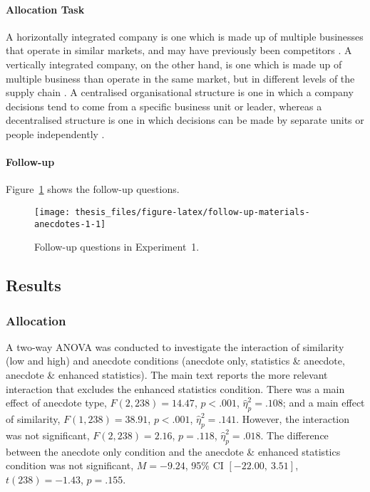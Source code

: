 \documentclass[a4paper, nobind]{templates/ociamthesis}
\theoremstyle{definition}
\theoremstyle{definition}
\theoremstyle{definition}
\theoremstyle{definition}
\theoremstyle{remark}
\begin{document}
\hypertarget{allocation-materials-anecdotes-1}{%
\paragraph{Allocation Task}\label{allocation-materials-anecdotes-1}}

A horizontally integrated company is one which is made up of multiple businesses
that operate in similar markets, and may have previously been competitors
\autocite{gaughan2012}. A vertically integrated company, on the other hand, is one which
is made up of multiple business than operate in the same market, but in
different levels of the supply chain \autocite{gaughan2012a}. A centralised
organisational structure is one in which a company decisions tend to come from a
specific business unit or leader, whereas a decentralised structure is one in
which decisions can be made by separate units or people independently
\autocite{kenton2021}.

\hypertarget{follow-up-materials-anecdotes-1}{%
\paragraph{Follow-up}\label{follow-up-materials-anecdotes-1}}

Figure~\ref{fig:follow-up-materials-anecdotes-1} shows the follow-up questions.



\begin{figure}
\texttt{[image: thesis\_files/figure-latex/follow-up-materials-anecdotes-1-1]} \caption{Follow-up questions in Experiment~1.}\label{fig:follow-up-materials-anecdotes-1}
\end{figure}

\hypertarget{results-anecdotes-1-appendix}{%
\subsection{Results}\label{results-anecdotes-1-appendix}}

\subsubsection{Allocation}

A two-way ANOVA was conducted to investigate the interaction of similarity (low
and high) and anecdote conditions (anecdote only, statistics \& anecdote,
anecdote \& enhanced statistics). The main text reports the more relevant
interaction that excludes the enhanced statistics condition. There was a main
effect of anecdote type, \(F(2, 238) = 14.47\), \(p < .001\), \(\hat{\eta}^2_p = .108\); and a main
effect of similarity, \(F(1, 238) = 38.91\), \(p < .001\), \(\hat{\eta}^2_p = .141\). However, the
interaction was not significant,
\(F(2, 238) = 2.16\), \(p = .118\), \(\hat{\eta}^2_p = .018\). The difference between
the anecdote only condition and the anecdote \& enhanced statistics condition was
not significant, \(M = -9.24\), 95\% CI \([-22.00,~3.51]\), \(t(238) = -1.43\), \(p = .155\).
\end{document}
